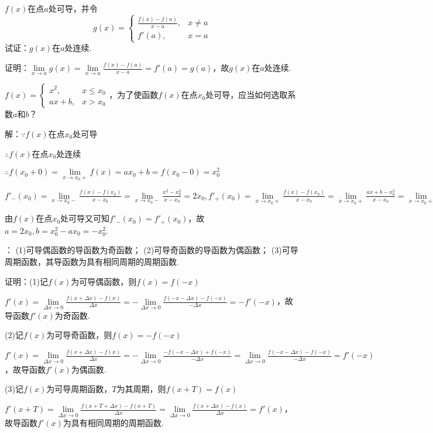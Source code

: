 \documentclass[12pt,UTF8]{ctexart}
\begin{document}
\begin{enumerate}
$f(x)$在点$a$处可导，并令
\[
g(x)=\begin{cases}
\frac{f(x)-f(a)}{x-a},&x\neq a\\
f'(a),&x=a
\end{cases}
\]
试证：$g(x)$在$a$处连续.

证明：$\lim\limits_{x\rightarrow a}g(x)=\lim\limits_{x\rightarrow a}\frac{f(x)-f(a)}{x-a}=f'(a)=g(a)$，故$g(x)$在$a$处连续.

$f(x)=\begin{cases}
x^2,&x\leq x_0\\
ax+b,&x>x_0
\end{cases}$，为了使函数$f(x)$在点$x_0$处可导，应当如何选取系数$a$和$b$？

解：$\because f(x)$在点$x_0$处可导

$\therefore f(x)$在点$x_0$处连续

$\therefore f(x_0+0)=\lim\limits_{x\rightarrow x_0+}f(x)=ax_0+b=f(x_0-0)=x_0^2$

$f'_-(x_0)=\lim\limits_{x\rightarrow x_0-}\frac{f(x)-f(x_0)}{x-x_0}=\lim\limits_{x\rightarrow x_0-}\frac{x^2-x_0^2}{x-x_0}=2x_0,f'_+(x_0)=\lim\limits_{x\rightarrow x_0+}\frac{f(x)-f(x_0)}{x-x_0}=\lim\limits_{x\rightarrow x_0+}\frac{ax+b-x_0^2}{x-x_0}=\lim\limits_{x\rightarrow x_0+}\frac{ax+b-ax+b}{x-x_0}=a$

由$f(x)$在点$x_0$处可导又可知$f'_-(x_0)=f'_+(x_0)$，故$a=2x_0,b=x_0^2-ax_0=-x_0^2$.

：
\newline
(1)可导偶函数的导函数为奇函数；
\newline
(2)可导奇函数的导函数为偶函数；
\newline
(3)可导周期函数，其导函数为具有相同周期的周期函数.

证明：(1)记$f(x)$为可导偶函数，则$f(x)=f(-x)$

$f'(x)=\lim\limits_{\Delta x\rightarrow0}\frac{f(x+\Delta x)-f(x)}{\Delta x}=-\lim\limits_{\Delta x\rightarrow0}\frac{f(-x-\Delta x)-f(-x)}{-\Delta x}=-f'(-x)$，故导函数$f'(x)$为奇函数.

(2)记$f(x)$为可导奇函数，则$f(x)=-f(-x)$

$f'(x)=\lim\limits_{\Delta x\rightarrow0}\frac{f(x+\Delta x)-f(x)}{\Delta x}=-\lim\limits_{\Delta x\rightarrow0}\frac{-f(-x-\Delta x)+f(-x)}{-\Delta x}=\lim\limits_{\Delta x\rightarrow0}\frac{f(-x-\Delta x)-f(-x)}{-\Delta x}=f'(-x)$，故导函数$f'(x)$为偶函数.

(3)记$f(x)$为可导周期函数，$T$为其周期，则$f(x+T)=f(x)$

$f'(x+T)=\lim\limits_{\Delta x\rightarrow0}\frac{f(x+T+\Delta x)-f(x+T)}{\Delta x}=\lim\limits_{\Delta x\rightarrow0}\frac{f(x+\Delta x)-f(x)}{\Delta x}=f'(x)$，故导函数$f'(x)$为具有相同周期的周期函数.
\end{enumerate}
\end{document}
